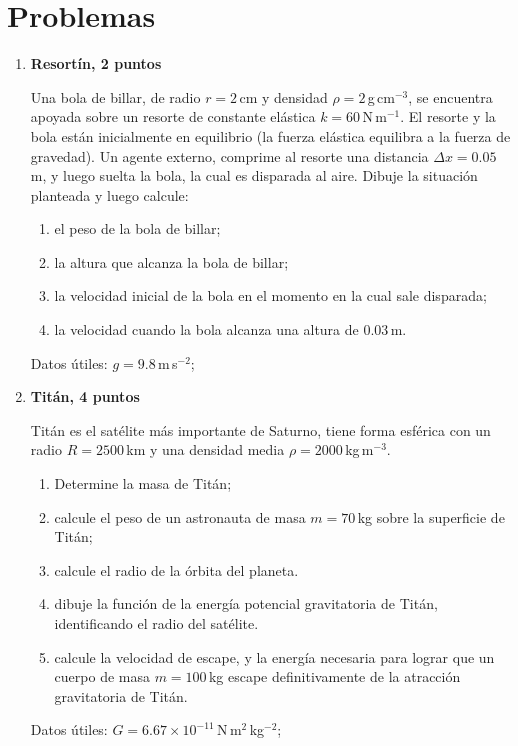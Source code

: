 \documentclass[a4paper,12pt]{article}
\begin{document}
\section{Problemas}

\begin{enumerate}

\item{\bf{Resortín, 2 puntos}}

Una bola de billar, de radio $r=2$\,cm y densidad
$\rho=2$\,g\,cm$^{-3}$, se encuentra apoyada sobre un resorte de
constante elástica $k=60$\,N\,m$^{-1}$. El resorte y la bola están inicialmente
en equilibrio (la fuerza elástica equilibra a la fuerza de gravedad). Un agente
externo, comprime al resorte una distancia $\Delta x=0.05$\,m, y luego suelta
la bola, la cual es disparada al aire.  Dibuje la situación planteada y luego
calcule:
\begin{enumerate}
\item el peso de la bola de billar;
\item la altura que alcanza la bola de billar;
\item la velocidad inicial de la bola en el momento en la cual sale disparada;
\item la velocidad cuando la bola alcanza una altura de $0.03$\,m.
\end{enumerate}
Datos útiles: $g = 9.8$\,m\,s$^{-2}$; 

\item{\bf{Titán, 4 puntos}}

Titán es el satélite más importante de Saturno, tiene forma esférica con un
radio $R=2500$\,km y una densidad media $\rho=2000$\,kg\,m$^{-3}$.

\begin{enumerate}
\item Determine la masa de Titán;
\item calcule el peso de un astronauta de masa $m=70$\,kg sobre la
superficie de Titán;
\item calcule el radio de la órbita del planeta.
\item dibuje la función de la energía potencial gravitatoria de Titán,
identificando el radio del satélite.
\item calcule la velocidad de escape, y la energía necesaria para
lograr que un cuerpo de masa $m=100$\,kg escape definitivamente de la
atracción gravitatoria de Titán.
\end{enumerate}

Datos útiles: $G = 6.67 \times 10^{-11}$\,N\,m$^2$\,kg$^{-2}$; 


\end{enumerate}
\end{document}
